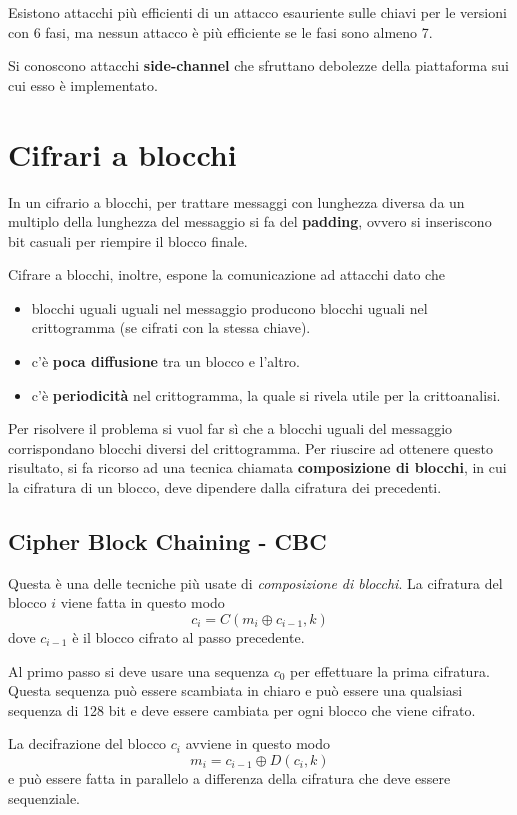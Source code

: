 Esistono attacchi pi\`u efficienti di un attacco esauriente sulle chiavi per le versioni con 6 fasi, ma nessun attacco
\`e pi\`u efficiente se le fasi sono almeno 7.

Si conoscono attacchi \textbf{side-channel} che sfruttano debolezze della piattaforma sui cui esso \`e implementato.

\section{Cifrari a blocchi}
In un cifrario a blocchi, per trattare messaggi con lunghezza diversa da un multiplo della lunghezza del messaggio si fa
del \textbf{padding}, ovvero si inseriscono bit casuali per riempire il blocco finale.

Cifrare a blocchi, inoltre, espone la comunicazione ad attacchi dato che
\begin{itemize}
	\item blocchi uguali uguali nel messaggio producono blocchi uguali nel crittogramma (se cifrati con la stessa
	      chiave).
	\item c'\`e \textbf{poca diffusione} tra un blocco e l'altro.
	\item c'\`e \textbf{periodicit\`a} nel crittogramma, la quale si rivela utile per la crittoanalisi.
\end{itemize}
Per risolvere il problema si vuol far s\`i che a blocchi uguali del messaggio corrispondano blocchi diversi del
crittogramma. Per riuscire ad ottenere questo risultato, si fa ricorso ad una tecnica chiamata
\textbf{composizione di	blocchi}, in cui la cifratura di un blocco, deve dipendere dalla cifratura dei precedenti.

\subsection{Cipher Block Chaining - CBC}
Questa \`e una delle tecniche pi\`u usate di \emph{composizione di blocchi}. La cifratura del blocco $i$ viene fatta
in questo modo
\[ c_i = C(m_i \oplus c_{i-1}, k) \]
dove $c_{i-1}$ \`e il blocco cifrato al passo precedente.

Al primo passo si deve usare una sequenza $c_0$ per effettuare la prima cifratura. Questa sequenza pu\`o essere
scambiata in chiaro e pu\`o essere una qualsiasi sequenza di 128 bit e deve essere cambiata per ogni blocco che
viene cifrato.

La decifrazione del blocco $c_i$ avviene in questo modo
\[ m_i = c_{i-1} \oplus D(c_i, k) \]
e pu\`o essere fatta in parallelo a differenza della cifratura che deve essere sequenziale.